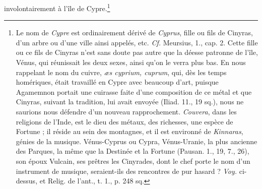 \documentclass[a4paper, 11pt, oneside, polutonikogreek, french]{article}
\begin{document}
involontairement à l'île de Cypre.\footnote{Le nom de \emph{Cypre} est ordinairement dérivé de \emph{Cyprus}, fille ou fils de Cinyras, d'un arbre ou d'une ville ainsi appelés, etc. \emph{Cf.} Meursius, 1., cap. 2. Cette fille ou ce fils de Cinyras n'est sans doute pas autre que la déesse patronne de l'île, Vénus, qui réunissait les deux sexes, ainsi qu'on le verra plus bas. En nous rappelant le nom du cuivre, \emph{æs cyprium, cuprum}, qui, dès les temps homériques, était travaillé en Cypre avec beaucoup d'art, puisque Agamemnon portait une cuirasse faite d'une composition de ce métal et que Cinyras, suivant la tradition, lui avait envoyée (Iliad. 11., 19 sq.), nous ne saurions nous défendre d'un nouveau rapprochement. \emph{Couvera}, dans les religions de l'Inde, est le dieu des métaux, des richesses, une espèce de Fortune ; il réside au sein des montagnes, et il est environné de \emph{Kinnaras}, génies de la musique. Vénus-Cyprus ou Cypra, Vénus-Uranie, la plus ancienne des Parques, la même que la Destinée et la Fortune (Pausan. 1., 19, 7., 26), son époux Vulcain, ses prêtres les Cinyrades, dont le chef porte le nom d'un instrument de musique, seraient-ils des rencontres de pur hasard ? \emph{Voy.} ci-dessus, et Relig. de l'ant., t. 1., p. 248 sq.}
\end{document}
